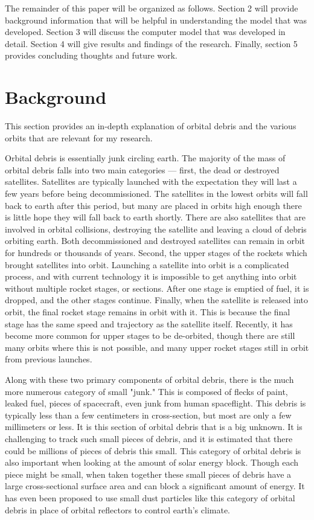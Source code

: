 \documentclass[11pt]{article}
\begin{document}
\begin{multicols*}{2}
The remainder of this paper will be organized as follows. Section 2 will provide background information that will be helpful in understanding the model that was developed. Section 3 will discuss the computer model that was developed in detail. Section 4 will give results and findings of the research. Finally, section 5 provides concluding thoughts and future work.

\section{Background} \label{background}
This section provides an in-depth explanation of orbital debris and the various orbits that are relevant for my research.

Orbital debris is essentially junk circling earth.\cite{nasa} The majority of the mass of orbital debris falls into two main categories — first, the dead or destroyed satellites. Satellites are typically launched with the expectation they will last a few years before being decommissioned. The satellites in the lowest orbits will fall back to earth after this period, but many are placed in orbits high enough there is little hope they will fall back to earth shortly. There are also satellites that are involved in orbital collisions, destroying the satellite and leaving a cloud of debris orbiting earth. Both decommissioned and destroyed satellites can remain in orbit for hundreds or thousands of years. Second, the upper stages of the rockets which brought satellites into orbit. Launching a satellite into orbit is a complicated process, and with current technology it is impossible to get anything into orbit without multiple rocket stages, or sections. After one stage is emptied of fuel, it is dropped, and the other stages continue. Finally, when the satellite is released into orbit, the final rocket stage remains in orbit with it. This is because the final stage has the same speed and trajectory as the satellite itself. Recently, it has become more common for upper stages to be de-orbited, though there are still many orbits where this is not possible, and many upper rocket stages still in orbit from previous launches.

Along with these two primary components of orbital debris, there is the much more numerous category of small "junk." This is composed of flecks of paint, leaked fuel, pieces of spacecraft, even junk from human spaceflight. This debris is typically less than a few centimeters in cross-section, but most are only a few millimeters or less. It is this section of orbital debris that is a big unknown. It is challenging to track such small pieces of debris, and it is estimated that there could be millions of pieces of debris this small.\cite{nasa} This category of orbital debris is also important when looking at the amount of solar energy block. Though each piece might be small, when taken together these small pieces of debris have a large cross-sectional surface area and can block a significant amount of energy. It has even been proposed to use small dust particles like this category of orbital debris in place of orbital reflectors to control earth's climate.\cite{dust}


\end{multicols*}
\end{document}
